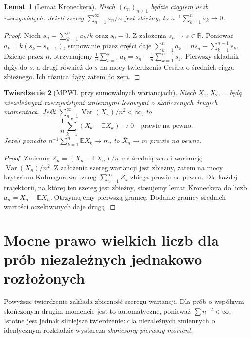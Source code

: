 \documentclass[11pt,a4paper,oneside]{report}
\numberwithin{equation}{chapter}
\theoremstyle{plain}
\newtheorem{twierdzenie}{Twierdzenie}[chapter]
\newtheorem{lemat}[twierdzenie]{Lemat}
\theoremstyle{definition}
\theoremstyle{remark}
\newcommand{\R}{\mathbb{R}}
\newcommand{\E}{\mathbb{E}}
\newcommand{\Var}{\operatorname{Var}}
\begin{document}
\begin{lemat}[Lemat Kroneckera]
Niech $(a_n)_{n\geq1}$ będzie ciągiem liczb rzeczywistych.
Jeżeli szereg $\sum_{n=1}^\infty a_n/n$ jest zbieżny,
to $n^{-1}\sum_{k=1}^n a_k\to0$.
\end{lemat}
\begin{proof}
Niech $s_n=\sum_{k=1}^n a_k/k$ oraz $s_0=0$.
Z założenia $s_n\to s\in\R$.
Ponieważ $a_k=k(s_k-s_{k-1})$, sumowanie przez części
daje
$\sum_{k=1}^n a_k=n s_n-\sum_{k=1}^{n-1}s_k$.
Dzieląc przez $n$, otrzymujemy
$\frac1n\sum_{k=1}^n a_k
=s_n-\frac1n\sum_{k=1}^{n-1}s_k$.
Pierwszy składnik dąży do $s$, a drugi również do $s$
na mocy twierdzenia Cesàra o średnich ciągu zbieżnego.
Ich różnica dąży zatem do zera.
\end{proof}

\begin{twierdzenie}[MPWL przy sumowalnych wariancjach]
Niech $X_1,X_2,\ldots$ będą niezależnymi rzeczywistymi
zmiennymi losowymi o skończonych drugich momentach.
Jeśli
$\sum_{n=1}^\infty\Var(X_n)/n^2<\infty$,
to
\[
\frac1n\sum_{k=1}^n(X_k-\E X_k)\longrightarrow0
\quad\text{prawie na pewno}.
\]
Jeżeli ponadto $n^{-1}\sum_{k=1}^n\E X_k\to m$,
to $\overline X_n\to m$ prawie na pewno.
\end{twierdzenie}
\begin{proof}
Zmienna $Z_n=(X_n-\E X_n)/n$ ma średnią zero
i wariancję $\Var(X_n)/n^2$. Z założenia szereg
wariancji jest zbieżny, zatem na mocy kryterium
Kołmogorowa szereg $\sum_{n=1}^\infty Z_n$
zbiega prawie na pewno. Dla każdej trajektorii,
na której ten szereg jest zbieżny, stosujemy
lemat Kroneckera do liczb $a_n=X_n-\E X_n$.
Otrzymujemy pierwszą granicę. Dodanie granicy
średnich wartości oczekiwanych daje drugą.
\end{proof}

\section{Mocne prawo wielkich liczb dla prób niezależnych jednakowo rozłożonych}

Powyższe twierdzenie zakłada zbieżność szeregu
wariancji. Dla prób o wspólnym skończonym drugim momencie
jest to automatyczne, ponieważ $\sum n^{-2}<\infty$.
Istotne jest jednak silniejsze twierdzenie: dla
niezależnych zmiennych o identycznym rozkładzie
wystarcza \emph{skończony pierwszy moment}.
\end{document}
